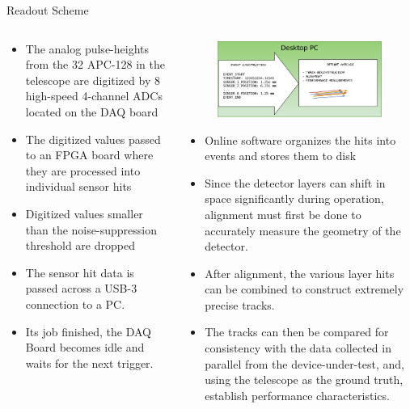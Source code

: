 \documentclass[final]{beamer}
\newlength{\onecolwide}
\newlength{\readoutimgheight}
\newlength{\readoutimgwidth}
\begin{document}
\begin{frame}[t]
\begin{exampleblock}{Readout Scheme}
\begin{columns}[t]
\begin{column}{\onecolwide}
\begin{figure}
      \end{figure}
      \footnotesize
      \begin{itemize}
      \itemsep0em 
        \item The analog pulse-heights from the 32 APC-128 in the telescope are digitized by 8 high-speed 4-channel ADCs located on the DAQ board
        \item The digitized values passed to an FPGA board where they are processed into individual sensor hits
        \item Digitized values smaller than the noise-suppression threshold are dropped
        \item The sensor hit data is passed across a USB-3 connection to a PC.\@
        \item Its job finished, the DAQ Board becomes idle and waits for the next trigger.
      \end{itemize}
    \end{column}
    \begin{column}{\onecolwide}
      \begin{figure}
        \centering
        \includegraphics[height=\readoutimgheight, width=\readoutimgwidth]{figures/Telescope_Data_Flow_Stage_III.pdf}
      \end{figure}
      \footnotesize
      \begin{itemize}
        \itemsep0em 
        \item Online software organizes the hits into events and stores them to disk
        \item Since the detector layers can shift in space significantly during operation, alignment must first be done to accurately measure the geometry of the detector.
        \item After alignment, the various layer hits can be combined to construct extremely precise tracks.
        \item The tracks can then be compared for consistency with the data collected in parallel from the device-under-test, and, using the telescope as the ground truth, establish performance characteristics.
      \end{itemize}
    \end{column}
  \end{columns}
\end{exampleblock}



\end{frame}
\end{document}
